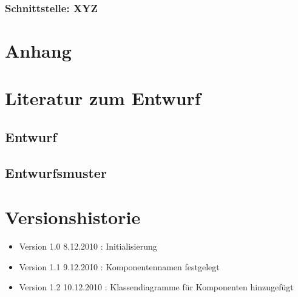 \documentclass[a4paper,12pt]{scrartcl}
\begin{document}
\subsubsection{Schnittstelle: XYZ}

\appendix%

\section{Anhang}

\section{Literatur zum Entwurf}
\subsection{Entwurf}
\subsection{Entwurfsmuster}
\section{Versionshistorie}
\begin{itemize}
\item Version 1.0 8.12.2010 : Initialisierung
\item Version 1.1 9.12.2010 : Komponentennamen festgelegt
\item Version 1.2 10.12.2010 : Klassendiagramme für Komponenten hinzugefügt
\end{itemize}
\end{document}
